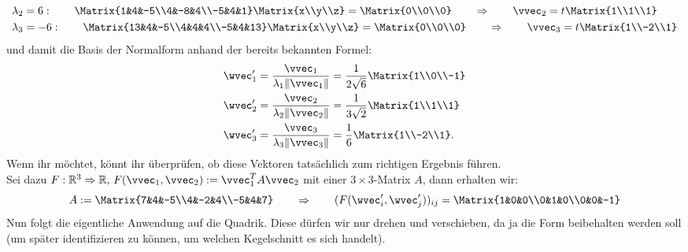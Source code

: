 \begin{Beispiel}
\begin{align*}
        \lambda_2&=6: \qquad \Matrix{1&4&-5\\4&-8&4\\-5&4&1}\Matrix{x\\y\\z}=\Matrix{0\\0\\0} \qquad \Rightarrow \qquad \vvec_2=t\Matrix{1\\1\\1} \\
        \lambda_3&=-6: \qquad \Matrix{13&4&-5\\4&4&4\\-5&4&13}\Matrix{x\\y\\z}=\Matrix{0\\0\\0} \qquad \Rightarrow \qquad \vvec_3=t\Matrix{1\\-2\\1}
    \end{align*}
    und damit die Basis der Normalform anhand der bereits bekannten Formel:
    \begin{align*}
        \wvec_1'&=\frac{\vvec_1}{\lambda_1\Vert \vvec_1\Vert}=\frac{1}{2\sqrt{6}}\Matrix{1\\0\\-1} \\
        \wvec_2'&=\frac{\vvec_2}{\lambda_2\Vert \vvec_2\Vert}=\frac{1}{3\sqrt{2}}\Matrix{1\\1\\1} \\
        \wvec_3'&=\frac{\vvec_3}{\lambda_3\Vert \vvec_3\Vert}=\frac{1}{6}\Matrix{1\\-2\\1}. 
    \end{align*}
    Wenn ihr möchtet, könnt ihr überprüfen, ob diese Vektoren tatsächlich zum richtigen Ergebnis führen.\\
    Sei dazu $F:\mathbb{R}^3 \Rightarrow \mathbb{R}, \, F(\vvec_1,\vvec_2):=\vvec_1^T A \vvec_2$ mit einer $3\times3$-Matrix $A$, dann erhalten wir:
    \begin{equation*}
        A:=\Matrix{7&4&-5\\4&-2&4\\-5&4&7} \qquad \Rightarrow \qquad (F(\wvec_i',\wvec_j'))_{ij}=\Matrix{1&0&0\\0&1&0\\0&0&-1}
    \end{equation*}
    Nun folgt die eigentliche Anwendung auf die Quadrik. Diese dürfen wir nur drehen und verschieben, da ja die Form beibehalten werden soll (um später identifizieren zu können, um welchen Kegelschnitt es sich handelt). \\

\end{Beispiel}
